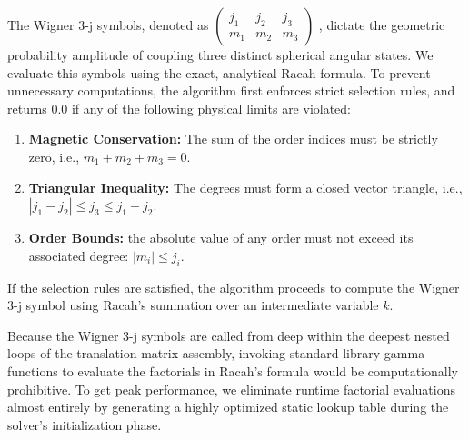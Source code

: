 
The Wigner 3-j symbols, denoted as $\begin{pmatrix} j_1 & j_2 & j_3 \\ m_1 & m_2 & m_3 \end{pmatrix}$ \cite{messiah1961quantum}, dictate the geometric probability amplitude of coupling three distinct spherical angular states. We evaluate this symbols using the exact, analytical Racah formula. To prevent unnecessary computations, the algorithm first enforces strict selection rules, and returns $0.0$ if any of the following physical limits are violated:
\begin{enumerate}
    \item \textbf{Magnetic Conservation:} The sum of the order indices must be strictly zero, i.e., $m_1 + m_2 + m_3 = 0$. 
    \item \textbf{Triangular Inequality:} The degrees must form a closed vector triangle, i.e., $|j_1 - j_2| \leq j_3 \leq j_1 + j_2$.
    \item \textbf{Order Bounds:} the absolute value of any order must not exceed its associated degree: $|m_i| \leq j_i$.
\end{enumerate}

If the selection rules are satisfied, the algorithm proceeds to compute the Wigner 3-j symbol using Racah's summation over an intermediate variable $k$.

\begin{insetBox}[title=Performance Optimization]
    Because the Wigner 3-j symbols are called from deep within the deepest nested loops of the translation matrix assembly, invoking standard library gamma functions to evaluate the factorials in Racah's formula would be computationally prohibitive. To get peak performance, we eliminate runtime factorial evaluations almost entirely by generating a highly optimized static lookup table during the solver's initialization phase.
\end{insetBox}

